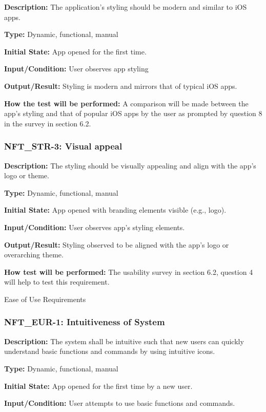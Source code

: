\documentclass[12pt, titlepage]{article}
\begin{document}
\textbf{Description: }The application’s styling should be modern and similar to iOS apps.

\textbf{Type: }Dynamic, functional, manual

\textbf{Initial State:} App opened for the first time.

\textbf{Input/Condition:} User observes app styling

\textbf{Output/Result: }Styling is modern and mirrors that of typical iOS apps. 

\textbf{How the test will be performed: }A comparison will be made between the app's styling and that of popular iOS apps by the user as prompted by question 8 in the survey in section 6.2. 


\subsubsection*{\textbf{NFT\_STR-3: Visual appeal}
}

\textbf{Description:} The styling should be visually appealing and align with the app’s logo or theme.

\textbf{Type:} Dynamic, functional, manual

\textbf{Initial State: }App opened with branding elements visible (e.g., logo).

\textbf{Input/Condition: }User observes app's styling elements.

\textbf{Output/Result: }Styling observed to be aligned with the app's logo or overarching theme.

\textbf{How test will be performed:} The usability survey in section 6.2, question 4 will help to test this requirement.


{Ease of Use Requirements}


\subsubsection*{\textbf{NFT\_EUR-1: Intuitiveness of System}
}

\textbf{Description: }The system shall be intuitive such that new users can quickly understand basic functions and commands by using intuitive icons.

\textbf{Type:} Dynamic, functional, manual

\textbf{Initial State:} App opened for the first time by a new user.

\textbf{Input/Condition:} User attempts to use basic functions and commands.
\end{document}
